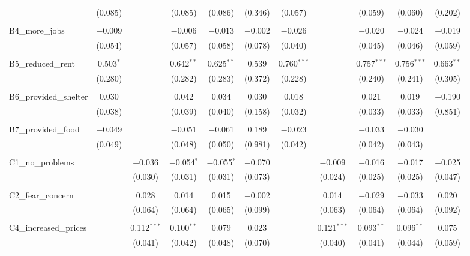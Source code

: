 \begin{table}[H]
\begin{tabular}{@{\extracolsep{4pt}}lcccccccccc}
  & (0.085) &  & (0.085) & (0.086) & (0.346) & (0.057) &  & (0.059) & (0.060) & (0.202) \\ 
  & & & & & & & & & & \\ 
 B4\_more\_jobs & $-$0.009 &  & $-$0.006 & $-$0.013 & $-$0.002 & $-$0.026 &  & $-$0.020 & $-$0.024 & $-$0.019 \\ 
  & (0.054) &  & (0.057) & (0.058) & (0.078) & (0.040) &  & (0.045) & (0.046) & (0.059) \\ 
  & & & & & & & & & & \\ 
 B5\_reduced\_rent & 0.503$^{*}$ &  & 0.642$^{**}$ & 0.625$^{**}$ & 0.539 & 0.760$^{***}$ &  & 0.757$^{***}$ & 0.756$^{***}$ & 0.663$^{**}$ \\ 
  & (0.280) &  & (0.282) & (0.283) & (0.372) & (0.228) &  & (0.240) & (0.241) & (0.305) \\ 
  & & & & & & & & & & \\ 
 B6\_provided\_shelter & 0.030 &  & 0.042 & 0.034 & 0.030 & 0.018 &  & 0.021 & 0.019 & $-$0.190 \\ 
  & (0.038) &  & (0.039) & (0.040) & (0.158) & (0.032) &  & (0.033) & (0.033) & (0.851) \\ 
  & & & & & & & & & & \\ 
 B7\_provided\_food & $-$0.049 &  & $-$0.051 & $-$0.061 & 0.189 & $-$0.023 &  & $-$0.033 & $-$0.030 &  \\ 
  & (0.049) &  & (0.048) & (0.050) & (0.981) & (0.042) &  & (0.042) & (0.043) &  \\ 
  & & & & & & & & & & \\ 
 C1\_no\_problems &  & $-$0.036 & $-$0.054$^{*}$ & $-$0.055$^{*}$ & $-$0.070 &  & $-$0.009 & $-$0.016 & $-$0.017 & $-$0.025 \\ 
  &  & (0.030) & (0.031) & (0.031) & (0.073) &  & (0.024) & (0.025) & (0.025) & (0.047) \\ 
  & & & & & & & & & & \\ 
 C2\_fear\_concern &  & 0.028 & 0.014 & 0.015 & $-$0.002 &  & 0.014 & $-$0.029 & $-$0.033 & 0.020 \\ 
  &  & (0.064) & (0.064) & (0.065) & (0.099) &  & (0.063) & (0.064) & (0.064) & (0.092) \\ 
  & & & & & & & & & & \\ 
 C4\_increased\_prices &  & 0.112$^{***}$ & 0.100$^{**}$ & 0.079 & 0.023 &  & 0.121$^{***}$ & 0.093$^{**}$ & 0.096$^{**}$ & 0.075 \\ 
  &  & (0.041) & (0.042) & (0.048) & (0.070) &  & (0.040) & (0.041) & (0.044) & (0.059) \\ 

\end{tabular}
\end{table}
